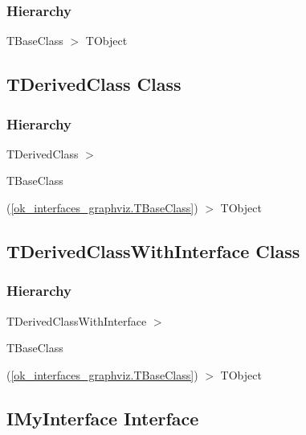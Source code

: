 \documentclass{report}
\newif\ifpdf
\begin{document}
\subsubsection*{\large{\textbf{Hierarchy}}\normalsize\hspace{1ex}\hfill}
TBaseClass {$>$} TObject
\ifpdf
\subsection*{\large{\textbf{TDerivedClass Class}}\normalsize\hspace{1ex}\hrulefill}
\else
\subsection*{TDerivedClass Class}
\fi
\label{ok_interfaces_graphviz.TDerivedClass}
\subsubsection*{\large{\textbf{Hierarchy}}\normalsize\hspace{1ex}\hfill}
TDerivedClass {$>$} \begin{ttfamily}TBaseClass\end{ttfamily}(\ref{ok_interfaces_graphviz.TBaseClass}) {$>$} 
TObject
\ifpdf
\subsection*{\large{\textbf{TDerivedClassWithInterface Class}}\normalsize\hspace{1ex}\hrulefill}
\else
\subsection*{TDerivedClassWithInterface Class}
\fi
\label{ok_interfaces_graphviz.TDerivedClassWithInterface}
\subsubsection*{\large{\textbf{Hierarchy}}\normalsize\hspace{1ex}\hfill}
TDerivedClassWithInterface {$>$} \begin{ttfamily}TBaseClass\end{ttfamily}(\ref{ok_interfaces_graphviz.TBaseClass}) {$>$} 
TObject
\ifpdf
\subsection*{\large{\textbf{IMyInterface Interface}}\normalsize\hspace{1ex}\hrulefill}
\else
\end{document}

